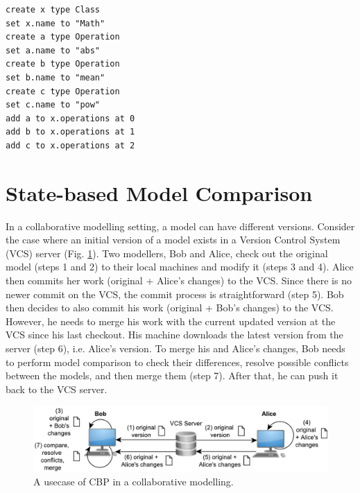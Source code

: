 \documentclass{jot}
\newcommand{\dk}[1]{\textcolor{blue}{\textbf{[Dimitris: #1]}}}
\begin{document}
\hfill
\begin{minipage}[t]{0.37\linewidth}
\begin{lstlisting}[style=eol,numbersep=10pt,caption={The pseudo-formatted CBP of the model in Fig. \ref{fig:origin}.},label=lst:origincbp]
create x type Class
set x.name to "Math" 
create a type Operation
set a.name to "abs" 
create b type Operation
set b.name to "mean" 
create c type Operation
set c.name to "pow" 
add a to x.operations at 0
add b to x.operations at 1
add c to x.operations at 2
\end{lstlisting}
\end{minipage}

\vspace{-5pt}
\section{State-based Model Comparison}
\label{sec:model_comparison}
    
    \vspace{-5pt}
    In a collaborative modelling setting, a model can have different versions.
    Consider the case where an initial version of a model exists in a Version Control System (VCS) server (Fig. \ref{fig:vcs}).
    Two modellers, Bob and Alice, check out the original model (steps 1 and 2) to their local machines and modify it (steps 3 and 4).
    Alice then commits her work (original + Alice's changes) to the VCS.
    Since there is no newer commit on the VCS, the commit process is straightforward (step 5).
    Bob then decides to also commit his work (original + Bob's changes) to the VCS.
    However, he needs to merge his work with the current updated version at the VCS since his last checkout.
    His machine downloads the latest version from the server (step 6), i.e. Alice's version.
    To merge his and Alice's changes, Bob needs to perform model comparison to check their differences, resolve possible conflicts between the models, and then merge them (step 7).
    After that, he can push it back to the VCS server.
    
    \begin{figure}[ht]
        \includegraphics[width=\linewidth]{VCS}
        \caption{A usecase of CBP in a collaborative modelling.}
        \label{fig:vcs}
    \end{figure}
    
\end{document}
